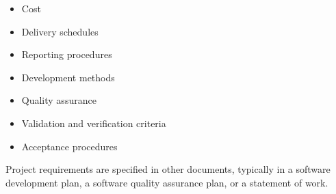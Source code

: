 {\begin{itemize}
	\begin{itemize}
	\item Cost
	\item Delivery schedules
	\item Reporting procedures
	\item Development methods
	\item Quality assurance
	\item Validation and verification criteria
	\item Acceptance procedures
	\end{itemize}
Project requirements are specified in other documents, typically in a software development plan, a software quality assurance plan, or a statement of work.
\end{itemize}
\clearpage
}

\newpage
	

	{\linespread{1.0} \tableofcontents}
	\newpage
	
		
	\newpage
		
    
    \listoffigures
        
    \listoftables
			
	
	
	
	
	
